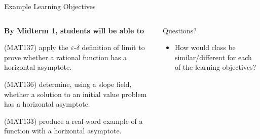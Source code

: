 \documentclass[10pt, aspectratio=169, t]{beamer}
\begin{document}
\begin{frame}{Example Learning Objectives}


\begin{columns}
\begin{column}{0.5\textwidth}

	{\noindent
	\bfseries
	By Midterm 1, students will be able to}
	\begin{block}{(MAT137)}
		\alert{apply} the $\varepsilon$-$\delta$ definition of limit to prove
		whether a rational function has a horizontal asymptote.
	\end{block}

	\begin{block}{(MAT136)}
		\alert{determine}, using a slope field, whether a solution to an initial value problem
		has a horizontal asymptote.
	\end{block}

	\begin{block}{(MAT133)}
		\alert{produce} a real-word example of a function with a horizontal asymptote.
	\end{block}

\end{column}
\begin{column}{0.5\textwidth}  %
	\begin{block}{Questions?}
		\begin{itemize}
			\item 
			How would class be similar/different for each of the learning objectives?
		\end{itemize}
	\end{block}
\end{column}
\end{columns}
\end{frame}
\end{document}
